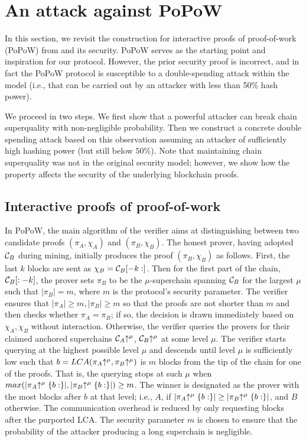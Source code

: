 \section{An attack against PoPoW \cite{KLS}}
\label{sec:attack}

In this section, we revisit the construction for interactive proofs of
proof-of-work (PoPoW) from \cite{KLS} and its security.
PoPoW serves as the starting point and inspiration for our protocol.
However, the prior security proof is incorrect, and in fact the PoPoW protocol
is susceptible to a double-spending attack within the model (i.e., that can be
carried out by an attacker with less than 50\% hash power).

We proceed in two steps. We first show that a powerful attacker can break chain
superquality with non-negligible probability. Then we construct a concrete
double spending  attack based on this observation assuming an attacker
of sufficiently high hashing power (but still below $50\%$).
Note that maintaining   chain
superquality was  not in the original security model; however, we show how the
property affects the security of the underlying blockchain proofs.

\subsection{Interactive proofs of proof-of-work}
In PoPoW, the main algorithm of the verifier aims at distinguishing between two
candidate proofs $(\pi_A, \chi_A)$ and $(\pi_B, \chi_B)$. The honest prover,
having adopted $\mathcal{C}_B$ during mining, initially produces the proof $(\pi_B,
\chi_B)$ as follows. First, the last $k$ blocks are sent as $\chi_B =
\mathcal{C}_B[-k:]$. Then for the first part of the chain, $\mathcal{C}_B[:-k]$, the
prover sets $\pi_B$ to be the $\mu$-superchain spanning $\mathcal{C}_B$ for the
largest $\mu$ such that $|\pi_B| = m$, where $m$ is the protocol's security
parameter. The verifier ensures that $|\pi_A| \geq m, |\pi_B| \geq m$ so that
the proofs are not shorter than $m$ and then checks whether $\pi_A = \pi_B$; if
so, the decision is drawn immediately based on $\chi_A,\chi_B$ without
interaction. Otherwise, the verifier queries the provers for their claimed
anchored superchains $\mathcal{C}_A\negthickspace\uparrow^\mu$, $\mathcal{C}_B\negthickspace\uparrow^\mu$ at some
level $\mu$. The verifier starts querying at the highest possible level $\mu$
and descends until level $\mu$ is sufficiently low such that $b =
LCA(\pi_A\negthickspace\uparrow^\mu, \pi_B\negthickspace\uparrow^\mu)$ is $m$ blocks from the tip of the
chain for one of the proofs. That is, the querying stops at such $\mu$ when
$max(|\pi_A\negthickspace\uparrow^\mu\{b:\}|, |\pi_B\negthickspace\uparrow^\mu\{b:\}|) \geq m$. The winner
is designated as the prover with the most blocks after $b$ at that level; i.e.,
$A$, if $|\pi_A\negthickspace\uparrow^\mu\{b:\}| \geq |\pi_B\negthickspace\uparrow^\mu\{b:\}|$, and $B$
otherwise. The communication overhead is reduced by only requesting blocks after
the purported LCA. The security parameter $m$ is chosen to ensure
that the probability of the attacker producing a long superchain is negligible.

